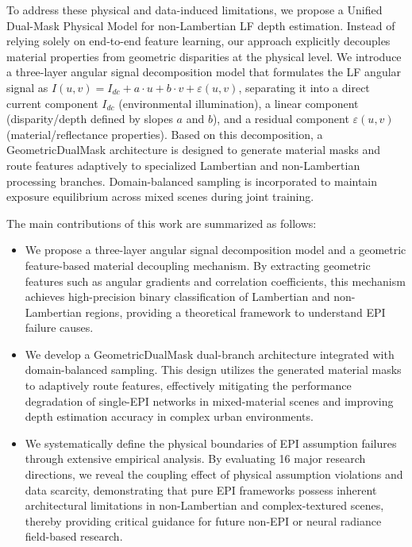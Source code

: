 \documentclass[lettersize,journal]{IEEEtran}
\begin{document}
To address these physical and data-induced limitations, we propose a Unified Dual-Mask Physical Model for non-Lambertian LF depth estimation. Instead of relying solely on end-to-end feature learning, our approach explicitly decouples material properties from geometric disparities at the physical level. We introduce a three-layer angular signal decomposition model that formulates the LF angular signal as $I(u,v) = I_{dc} + a \cdot u + b \cdot v + \varepsilon(u,v)$, separating it into a direct current component $I_{dc}$ (environmental illumination), a linear component (disparity/depth defined by slopes $a$ and $b$), and a residual component $\varepsilon(u,v)$ (material/reflectance properties). Based on this decomposition, a GeometricDualMask architecture is designed to generate material masks and route features adaptively to specialized Lambertian and non-Lambertian processing branches. Domain-balanced sampling is incorporated to maintain exposure equilibrium across mixed scenes during joint training.

The main contributions of this work are summarized as follows:
\begin{itemize}
\item We propose a three-layer angular signal decomposition model and a geometric feature-based material decoupling mechanism. By extracting geometric features such as angular gradients and correlation coefficients, this mechanism achieves high-precision binary classification of Lambertian and non-Lambertian regions, providing a theoretical framework to understand EPI failure causes.
\item We develop a GeometricDualMask dual-branch architecture integrated with domain-balanced sampling. This design utilizes the generated material masks to adaptively route features, effectively mitigating the performance degradation of single-EPI networks in mixed-material scenes and improving depth estimation accuracy in complex urban environments.
\item We systematically define the physical boundaries of EPI assumption failures through extensive empirical analysis. By evaluating 16 major research directions, we reveal the coupling effect of physical assumption violations and data scarcity, demonstrating that pure EPI frameworks possess inherent architectural limitations in non-Lambertian and complex-textured scenes, thereby providing critical guidance for future non-EPI or neural radiance field-based research.
\end{itemize}
\end{document}
